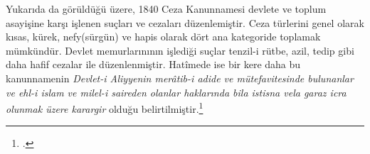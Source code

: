 Yukarıda da görüldüğü üzere, 1840 Ceza Kanunnamesi devlete ve toplum asayişine karşı işlenen suçları ve cezaları düzenlemiştir. Ceza türlerini genel olarak kısas, kürek, nefy(sürgün) ve hapis olarak dört ana kategoride toplamak mümkündür. 
Devlet memurlarınının işlediği suçlar tenzil-i rütbe, azil, tedip gibi daha hafif cezalar ile düzenlenmiştir. Hatîmede ise bir kere daha bu kanunnamenin \textit{Devlet-i Aliyyenin merâtib-i adide ve mütefavitesinde bulunanlar ve ehl-i islam ve milel-i saireden olanlar haklarında bila istisna vela garaz icra olunmak üzere karargir}
olduğu belirtilmiştir.\footcite[819]{islam_osmanli_hukuku}